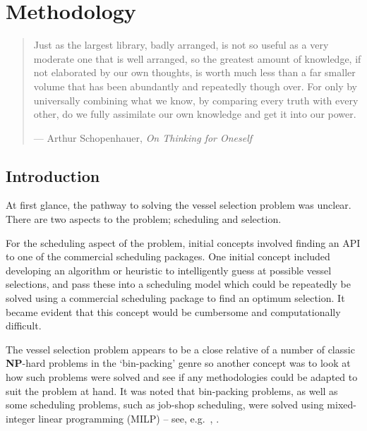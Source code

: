 %
%
%
%

\chapter{Methodology}\label{C.methodology}

\begin{quote}
Just as the largest library, badly arranged, is not so useful as a very
moderate one that is well arranged, so the greatest amount of knowledge, if not
elaborated by our own thoughts, is worth much less than a far smaller volume
that has been abundantly and repeatedly though over.  For only by universally
combining what we know, by comparing every truth with every other, do we fully
assimilate our own knowledge and get it into our power.

\hspace{2cm}--- Arthur Schopenhauer, \emph{On Thinking for Oneself}
\end{quote}

\section{Introduction}\label{S.intro4}
At first glance, the pathway to solving the vessel selection problem was
unclear.
There are two aspects to the problem; scheduling and selection.

For the scheduling aspect of the problem, initial concepts involved finding an
API to one of the commercial scheduling packages.
One initial concept included developing an algorithm or heuristic to
intelligently guess at possible vessel selections, and pass these into a
scheduling model which could be repeatedly be solved using a commercial
scheduling package to find an optimum selection.
It became evident that this concept would be cumbersome and computationally
difficult.

The vessel selection problem appears to be a close relative of a number of
classic \textbf{NP}-hard problems in the `bin-packing' genre so another
concept was to look at how such problems were solved and see if any
methodologies could be adapted to suit the problem at hand.
It was noted that bin-packing problems, as well as some scheduling problems,
such as job-shop scheduling, were solved using mixed-integer linear
programming (MILP) -- see, e.g.\ \citet{Martello:1990}, \citet{Taha:2017}.

